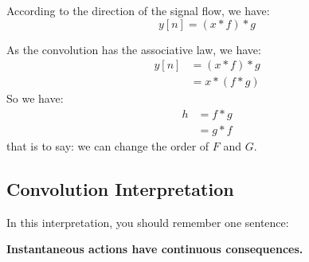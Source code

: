     According to the direction of the signal flow, we have:
        \begin{equation}
            y[n] = (x\ast f) \ast g
        \end{equation}
    
    As the convolution has the associative law, we have:
        \begin{equation}
            \begin{aligned}
                y[n] &= (x\ast f) \ast g \\
                     &= x \ast (f \ast g) 
            \end{aligned}
        \end{equation}
    So we have:
        \begin{equation}
            \begin{aligned}
            h &=  f \ast g \\
              &=  g \ast f
            \end{aligned}
        \end{equation}
    that is to say: we can change the order of $F$ and $G$.

    \subsection{Convolution Interpretation}
    In this interpretation, you should remember one sentence:

    \textbf{Instantaneous actions have continuous consequences.}

